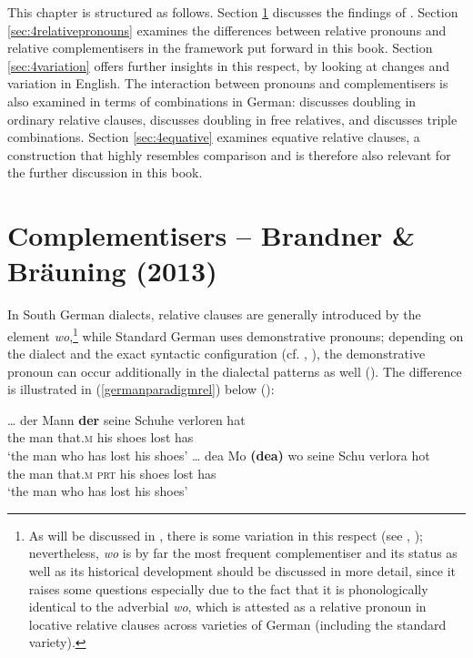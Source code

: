 This chapter is structured as follows. Section \ref{sec:4relative} discusses the findings of \citet{brandnerbraeuning2013}. Section \ref{sec:4relativepronouns} examines the differences between relative pronouns and relative complementisers in the framework put forward in this book. Section \ref{sec:4variation} offers further insights in this respect, by looking at changes and variation in English. The interaction between pronouns and complementisers is also examined in terms of combinations in German:  discusses doubling in ordinary relative clauses,  discusses doubling in free relatives, and  discusses triple combinations. Section \ref{sec:4equative} examines equative relative clauses, a construction that highly resembles comparison and is therefore also relevant for the further discussion in this book.

\section{Complementisers -- Brandner \& Bräuning (2013)} \label{sec:4relative}
In South German dialects, relative clauses are generally introduced by the element \textit{wo},\footnote{As will be discussed in , there is some variation in this respect (see \citealt{fleischer2004, fleischer2016}, \citealt{weiss2013}); nevertheless, \textit{wo} is by far the most frequent complementiser and its status as well as its historical development should be discussed in more detail, since it raises some questions especially due to the fact that it is phonologically identical to the adverbial \textit{wo}, which is attested as a relative pronoun in locative relative clauses across varieties of German (including the standard variety).} while Standard German uses demonstrative pronouns; depending on the dialect and the exact syntactic configuration (cf. \citealt{bayer1984}, \citealt{salzmann2006, salzmann2009}), the demonstrative pronoun can occur additionally in the dialectal patterns as well (\citealt[131--132]{brandnerbraeuning2013}). The difference is illustrated in (\ref{germanparadigmrel}) below (\citealt[132, ex. 1 and 2]{brandnerbraeuning2013}):

\ea \label{germanparadigmrel}
\ea \gll \ldots{} der Mann \textbf{der} seine Schuhe verloren hat\\
{} the man that.\textsc{m} his shoes lost has\\
\glt `the man who has lost his shoes'
\ex \gll \ldots{} dea Mo \textbf{(dea)} wo seine Schu verlora hot\\
{} the man \phantom{\textbf{(}}that.\textsc{m} \textsc{prt} his shoes lost has\\
\glt `the man who has lost his shoes'
\z
\z

